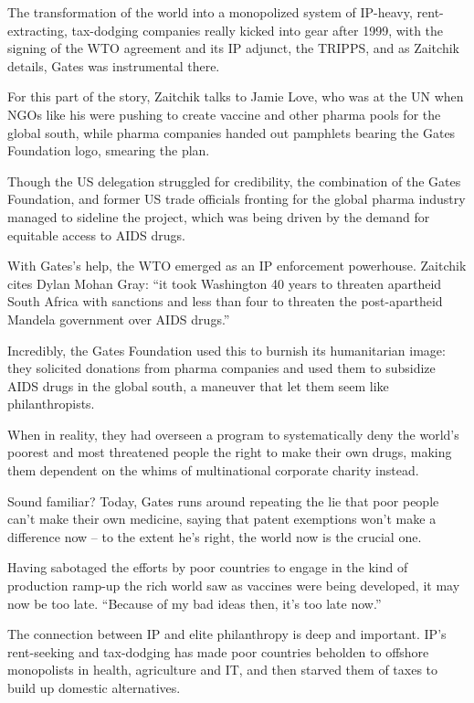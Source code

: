 \documentclass[
]{book}
\begin{document}
The transformation of the world into a monopolized system of IP-heavy, rent-extracting, tax-dodging companies really kicked into gear after 1999, with the signing of the WTO agreement and its IP adjunct, the TRIPPS, and as Zaitchik details, Gates was instrumental there.

For this part of the story, Zaitchik talks to Jamie Love, who was at the UN when NGOs like his were pushing to create vaccine and other pharma pools for the global south, while pharma companies handed out pamphlets bearing the Gates Foundation logo, smearing the plan.

Though the US delegation struggled for credibility, the combination of the Gates Foundation, and former US trade officials fronting for the global pharma industry managed to sideline the project, which was being driven by the demand for equitable access to AIDS drugs.

With Gates's help, the WTO emerged as an IP enforcement powerhouse. Zaitchik cites Dylan Mohan Gray: ``it took Washington 40 years to threaten apartheid South Africa with sanctions and less than four to threaten the post-apartheid Mandela government over AIDS drugs.''

Incredibly, the Gates Foundation used this to burnish its humanitarian image: they solicited donations from pharma companies and used them to subsidize AIDS drugs in the global south, a maneuver that let them seem like philanthropists.

When in reality, they had overseen a program to systematically deny the world's poorest and most threatened people the right to make their own drugs, making them dependent on the whims of multinational corporate charity instead.

Sound familiar? Today, Gates runs around repeating the lie that poor people can't make their own medicine, saying that patent exemptions won't make a difference now -- to the extent he's right, the world now is the crucial one.

Having sabotaged the efforts by poor countries to engage in the kind of production ramp-up the rich world saw as vaccines were being developed, it may now be too late. ``Because of my bad ideas then, it's too late now.''

The connection between IP and elite philanthropy is deep and important. IP's rent-seeking and tax-dodging has made poor countries beholden to offshore monopolists in health, agriculture and IT, and then starved them of taxes to build up domestic alternatives.
\end{document}
